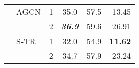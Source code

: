 \documentclass[journal]{IEEEtran}
\newcommand\paretocolor{lgreen!20}
\theoremstyle{definition}
\begin{document}
\begin{table}[!tbp]
\begin{center}
{\begin{tabular}{llcccr}
    & AGCN                                            & 1     & \colorbox{\paretocolor}{35.0}      & \colorbox{\paretocolor}{57.5}  & \colorbox{\paretocolor}{13.45} \\
    &                                                           & 2     & \colorbox{\paretocolor}{\textbf{\textit{36.9}}}      & \colorbox{\paretocolor}{59.6}  & \colorbox{\paretocolor}{26.91} \\
    & S-TR                                            & 1     
                                                                        & \colorbox{\paretocolor}{32.0}      & \colorbox{\paretocolor}{54.9}  &  \colorbox{\paretocolor}{\textbf{11.62}} \\
    &                                                           & 2     & \colorbox{\paretocolor}{34.7}      & \colorbox{\paretocolor}{57.9}  & \colorbox{\paretocolor}{23.24} \\
  

\end{tabular}}
\end{center}
\end{table}
\end{document}
